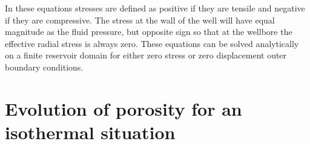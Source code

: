 \documentclass[12pt]{report}
\begin{document}

In these equations stresses are defined as positive if they are tensile and negative if they are compressive. The stress at the wall of the well will have equal magnitude as the fluid pressure, but opposite sign so that at the wellbore the effective radial stress is always zero.  These equations can be solved analytically on a finite reservoir domain for either zero stress or zero displacement outer boundary conditions.

%
%

\chapter{Evolution of porosity for an isothermal situation}
\label{chap.evol.por}
\end{document}
